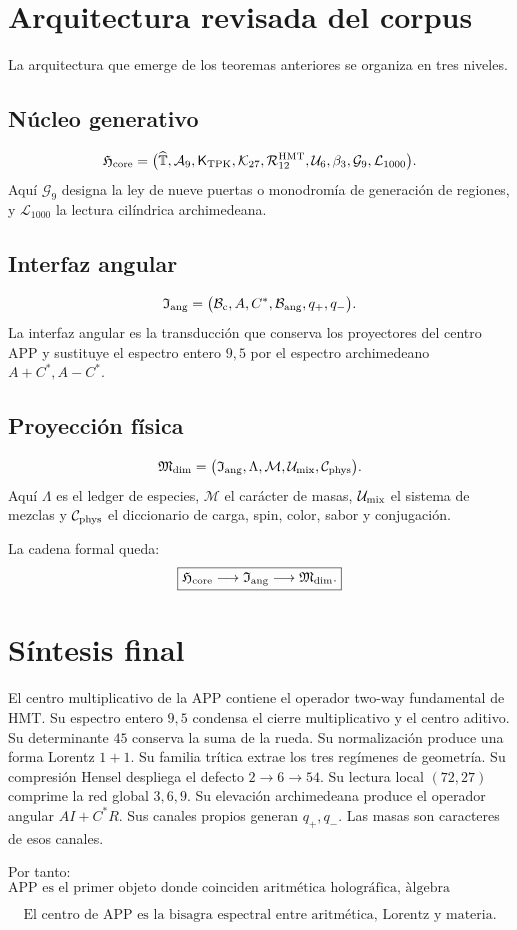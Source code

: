 \documentclass[11pt,a4paper]{article}
\newcommand{\Bc}{\mathcal B_{\rm c}}
\newcommand{\Bang}{\mathcal B_{\rm ang}}
\begin{document}
\section{Arquitectura revisada del corpus}

La arquitectura que emerge de los teoremas anteriores se organiza en tres niveles.

\subsection*{N\'ucleo generativo}
\[
\mathfrak H_{\rm core}=\bigl(
\widehat{\mathbb T},
\mathcal A_9,
\mathsf K_{\rm TPK},
\mathcal K_{27},
\mathcal R_{12}^{\rm HMT},
\mathcal U_6,
\beta_3,
\mathcal G_9,
\mathcal L_{1000}
\bigr).
\]
Aqu\'i \(\mathcal G_9\) designa la ley de nueve puertas o monodrom\'ia de generaci\'on de regiones, y \(\mathcal L_{1000}\) la lectura cil\'indrica archimedeana.

\subsection*{Interfaz angular}
\[
\mathfrak I_{\rm ang}=\bigl(
\Bc,
A,
C^\ast,
\Bang,
q_+,
q_-
\bigr).
\]
La interfaz angular es la transducci\'on que conserva los proyectores del centro APP y sustituye el espectro entero \(9,5\) por el espectro archimedeano \(A+C^\ast,A-C^\ast\).

\subsection*{Proyecci\'on f\'isica}
\[
\mathfrak M_{\rm dim}=\bigl(
\mathfrak I_{\rm ang},
\Lambda,
\mathcal M,
\mathcal U_{\rm mix},
\mathcal C_{\rm phys}
\bigr).
\]
Aqu\'i \(\Lambda\) es el ledger de especies, \(\mathcal M\) el car\'acter de masas, \(\mathcal U_{\rm mix}\) el sistema de mezclas y \(\mathcal C_{\rm phys}\) el diccionario de carga, spin, color, sabor y conjugaci\'on.

La cadena formal queda:
\[
\boxed{\mathfrak H_{\rm core}\longrightarrow \mathfrak I_{\rm ang}\longrightarrow \mathfrak M_{\rm dim}.}
\]

\section{S\'intesis final}

El centro multiplicativo de la APP contiene el operador two-way fundamental de HMT. Su espectro entero \(9,5\) condensa el cierre multiplicativo y el centro aditivo. Su determinante \(45\) conserva la suma de la rueda. Su normalizaci\'on produce una forma Lorentz \(1+1\). Su familia tr\'itica extrae los tres reg\'imenes de geometr\'ia. Su compresi\'on Hensel despliega el defecto \(2\to6\to54\). Su lectura local \((72,27)\) comprime la red global \(3,6,9\). Su elevaci\'on archimedeana produce el operador angular \(AI+C^\ast R\). Sus canales propios generan \(q_+,q_-\). Las masas son caracteres de esos canales.

Por tanto:
\[
\boxed{\text{APP es el primer objeto donde coinciden aritm\'etica hologr\'afica, \`algebra hologr\'afica y geometr\'ia hologr\'afica.}}
\]

\[
\boxed{\text{El centro de APP es la bisagra espectral entre aritm\'etica, Lorentz y materia.}}
\]
\end{document}

